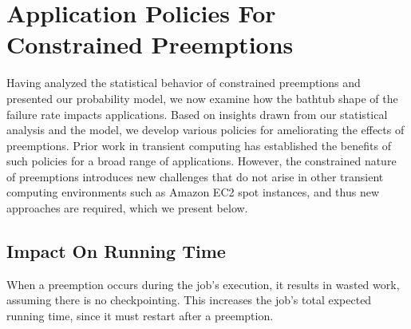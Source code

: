 
\section{Application Policies For Constrained Preemptions}

Having analyzed the statistical behavior of constrained preemptions and presented our probability model, we now examine how the bathtub shape of the failure rate impacts applications.
Based on insights drawn from our statistical analysis and the model, we develop various policies for ameliorating the effects of preemptions. 
Prior work in transient computing has established the benefits of such policies for a broad range of applications.
However, the constrained nature of preemptions introduces new challenges that do not arise in other transient computing environments such as Amazon EC2 spot instances, and thus new approaches are required, which we present below. 







\subsection{Impact On Running Time}

When a preemption occurs during the job's execution, it results in wasted work, assuming there is no checkpointing.
This increases the job's total expected running time, since it must restart after a preemption.

